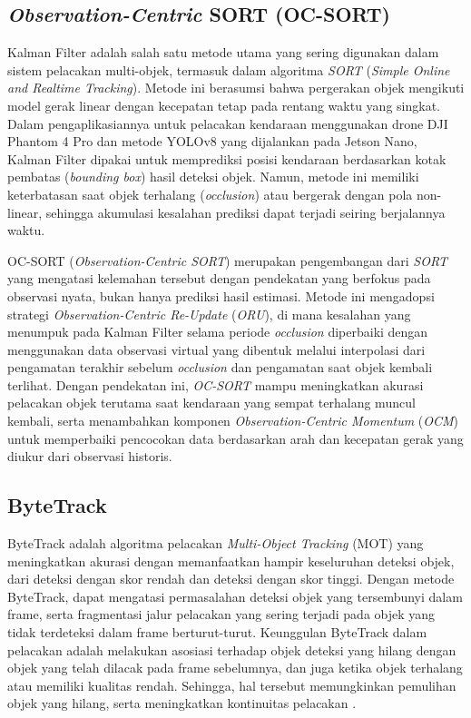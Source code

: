 \subsection{\emph{Observation-Centric} SORT (OC-SORT)}
Kalman Filter adalah salah satu metode utama yang sering digunakan dalam sistem pelacakan multi-objek, termasuk dalam algoritma \emph{SORT} (\emph{Simple Online and Realtime Tracking}). Metode ini berasumsi bahwa pergerakan objek mengikuti model gerak linear dengan kecepatan tetap pada rentang waktu yang singkat. Dalam pengaplikasiannya untuk pelacakan kendaraan menggunakan drone DJI Phantom 4 Pro dan metode YOLOv8 yang dijalankan pada Jetson Nano, Kalman Filter dipakai untuk memprediksi posisi kendaraan berdasarkan kotak pembatas (\emph{bounding box}) hasil deteksi objek. Namun, metode ini memiliki keterbatasan saat objek terhalang (\emph{occlusion}) atau bergerak dengan pola non-linear, sehingga akumulasi kesalahan prediksi dapat terjadi seiring berjalannya waktu.

OC-SORT (\emph{Observation-Centric SORT}) merupakan pengembangan dari \emph{SORT} yang mengatasi kelemahan tersebut dengan pendekatan yang berfokus pada observasi nyata, bukan hanya prediksi hasil estimasi. Metode ini mengadopsi strategi \emph{Observation-Centric Re-Update} (\emph{ORU}), di mana kesalahan yang menumpuk pada Kalman Filter selama periode \emph{occlusion} diperbaiki dengan menggunakan data observasi virtual yang dibentuk melalui interpolasi dari pengamatan terakhir sebelum \emph{occlusion} dan pengamatan saat objek kembali terlihat. Dengan pendekatan ini, \emph{OC-SORT} mampu meningkatkan akurasi pelacakan objek terutama saat kendaraan yang sempat terhalang muncul kembali, serta menambahkan komponen \emph{Observation-Centric Momentum} (\emph{OCM}) untuk memperbaiki pencocokan data berdasarkan arah dan kecepatan gerak yang diukur dari observasi historis\cite{Cao2023}.

\subsection{ByteTrack}
ByteTrack adalah algoritma pelacakan \emph{Multi-Object Tracking} (MOT) yang meningkatkan akurasi dengan memanfaatkan hampir keseluruhan deteksi objek, dari deteksi dengan skor rendah dan deteksi dengan skor tinggi. Dengan metode ByteTrack, dapat mengatasi permasalahan deteksi objek yang tersembunyi dalam frame, serta fragmentasi jalur pelacakan yang sering terjadi pada objek yang tidak terdeteksi dalam frame berturut-turut. Keunggulan ByteTrack dalam pelacakan adalah melakukan asosiasi terhadap objek deteksi yang hilang dengan objek yang telah dilacak pada frame sebelumnya, dan juga ketika objek terhalang atau memiliki kualitas rendah. Sehingga, hal tersebut memungkinkan pemulihan objek yang hilang, serta meningkatkan kontinuitas pelacakan \cite{Zhang2022ByteTrack}.

